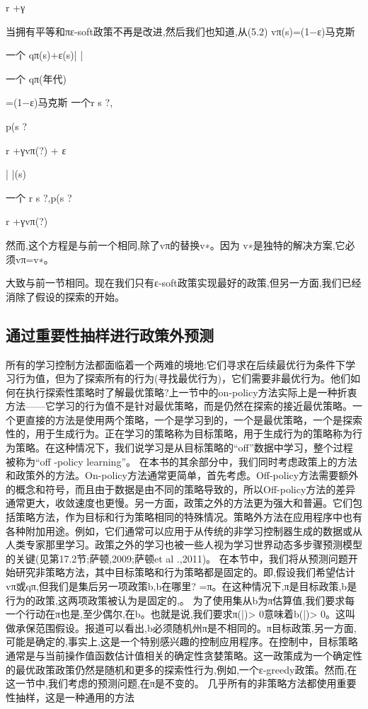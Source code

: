 r +γ

当拥有平等和πε-soft政策不再是改进,然后我们也知道,从(5.2)
vπ(s)=(1−ε)马克斯

一个
qπ(s)+ε(s)| |

一个
qπ(年代)

=(1−ε)马克斯
一个r s ?,

p(s ?


r +γvπ(?)
+
ε

| |(s)

一个
r s ?,p(s ?

r +γvπ(?)

然而,这个方程是与前一个相同,除了vπ的替换v∗。因为
v∗是独特的解决方案,它必须vπ=v∗。

大致与前一节相同。现在我们只有ε-soft政策实现最好的政策,但另一方面,我们已经消除了假设的探索的开始。


\subsection{通过重要性抽样进行政策外预测}

所有的学习控制方法都面临着一个两难的境地:它们寻求在后续最优行为条件下学习行为值，但为了探索所有的行为(寻找最优行为)，它们需要非最优行为。他们如何在执行探索性策略时了解最优策略?上一节中的on-policy方法实际上是一种折衷方法——它学习的行为值不是针对最优策略，而是仍然在探索的接近最优策略。一个更直接的方法是使用两个策略，一个是学习到的，一个是最优策略，一个是探索性的，用于生成行为。正在学习的策略称为目标策略，用于生成行为的策略称为行为策略。在这种情况下，我们说学习是从目标策略的“off”数据中学习，整个过程被称为“off -policy learning”。
在本书的其余部分中，我们同时考虑政策上的方法和政策外的方法。On-policy方法通常更简单，首先考虑。Off-policy方法需要额外的概念和符号，而且由于数据是由不同的策略导致的，所以Off-policy方法的差异通常更大，收敛速度也更慢。另一方面，政策之外的方法更为强大和普遍。它们包括策略方法，作为目标和行为策略相同的特殊情况。策略外方法在应用程序中也有各种附加用途。例如，它们通常可以应用于从传统的非学习控制器生成的数据或从人类专家那里学习。政策之外的学习也被一些人视为学习世界动态多步骤预测模型的关键(见第17.2节;萨顿,2009;萨顿et al .,2011)。
在本节中，我们将从预测问题开始研究非策略方法，其中目标策略和行为策略都是固定的。即,假设我们希望估计vπ或qπ,但我们是集后另一项政策b,b在哪里? =π。在这种情况下,π是目标政策,b是行为的政策,这两项政策被认为是固定的,。
为了使用集从b为π估算值,我们要求每一个行动在π也是,至少偶尔,在b。也就是说,我们要求π(|)> 0意味着b(|)> 0。这叫做承保范围假设。报道可以看出,b必须随机州π是不相同的。π目标政策,另一方面,可能是确定的,事实上,这是一个特别感兴趣的控制应用程序。在控制中，目标策略通常是与当前操作值函数估计值相关的确定性贪婪策略。这一政策成为一个确定性的最优政策政策仍然是随机和更多的探索性行为,例如,一个ε-greedy政策。然而,在这一节中,我们考虑的预测问题,在π是不变的。
几乎所有的非策略方法都使用重要性抽样，这是一种通用的方法

